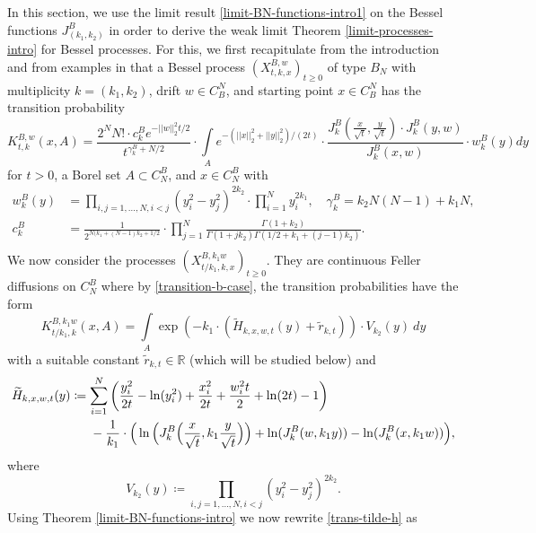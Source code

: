 \documentclass[reqno]{amsart}
\theoremstyle{plain}
\theoremstyle{definition}
\numberwithin{equation}{section}
\newcommand{\R}{\mathbb{R}}
\begin{document}
In this section, we  use the limit result \eqref{limit-BN-functions-intro1}
 on the Bessel functions $J_{(k_1,k_2)}^B$
in order to derive the weak limit Theorem \ref{limit-processes-intro}
for Bessel processes.
For this, we first recapitulate from the introduction  and from examples in \cite{V2} that a Bessel process
$(X^{B,w}_{t,k,x})_{t \geq 0}$ of type $B_N$ with multiplicity $k=(k_1,k_2)$, drift $w \in C^N_B$, and starting point $x\in C^N_B$ 
has the transition probability
\begin{equation}\label{transition-b-case}
K_{t,k}^{B,w}(x,A)=\frac{2^N N! \cdot c_k^B e^{-||w||_2^2 t/2}}{t^{\gamma_k^B+N/2}}
\cdot \int\limits_A e^{-(||x||_2^2+||y||_2^2)/(2t)} \cdot \frac{J^B_k(\frac{x}{\sqrt t},\frac{y}{\sqrt{t}}) \cdot J_k^B(y,w)}{J_k^B(x,w)} \cdot w_k^B(y)
       dy
\end{equation}
for $t>0$, a Borel set $A\subset C_N^B$, and $x\in C_N^B$ with
\begin{align*}
w_k^B(y) &= \prod\limits_{i,j=1,\ldots,N, i<j} (y_i^2-y_j^2)^{2 k_2} \cdot \prod\limits_{i=1}^N y_i^{2 k_1}, \quad
\gamma_k^B=k_2 N(N-1)+k_1N, \\ 
c_k^B&=\frac{1}{2^{N(k_1+(N-1)k_2+1/2}} \cdot \prod\limits_{j=1}^N \frac{\Gamma(1+k_2)}{\Gamma(1+jk_2)\Gamma(1/2+k_1+(j-1)k_2)}. \\
\end{align*}
We now consider the processes $(X^{B,k_1w}_{t/k_1,k,x})_{t \geq 0}$.
They are continuous Feller diffusions on $C_N^B$ where by \eqref{transition-b-case}, the transition probabilities
have the form
\begin{equation}\label{trans-tilde-h}
K_{t/k_1,k}^{B,k_1 w}(x,A) 
=\int\limits_A \exp( -k_1 \cdot (  \widetilde{H}_{k,x,w,t}(y) + \widetilde{r}_{k,t} ) ) \cdot V_{k_2}(y) \> dy
\end{equation}
with a suitable constant  $\widetilde{r}_{k,t} \in \R$ (which will be studied below) and 
\begin{align*}
\widetilde{H}_{k,x,w,t}(y) &\coloneqq \sum\limits_{i=1}^N \bigg( \frac{y_i^2}{2t} - \ln(y_i^2)+\frac{x_i^2}{2t}+\frac{w_i^2t}{2}+\ln(2t)-1 \bigg) \\ 
&\>\>\>\>\>\>\>-\frac{1}{k_1} \cdot \Big( \ln\Big( J_k^B \Big( \frac{x}{\sqrt{t}},k_1 \frac{y}{\sqrt{t}} \Big) \Big) + \ln( J_k^B(w,k_1 y)) - \ln( J_k^B(x,k_1 w)) \Big),\notag
\end{align*}
where
$$V_{k_2}(y) \coloneqq \prod\limits_{i,j=1,\ldots,N, i<j} (y_i^2-y_j^2)^{2 k_2}.$$
Using Theorem \ref{limit-BN-functions-intro} we now rewrite     \eqref{trans-tilde-h} as
\end{document}
